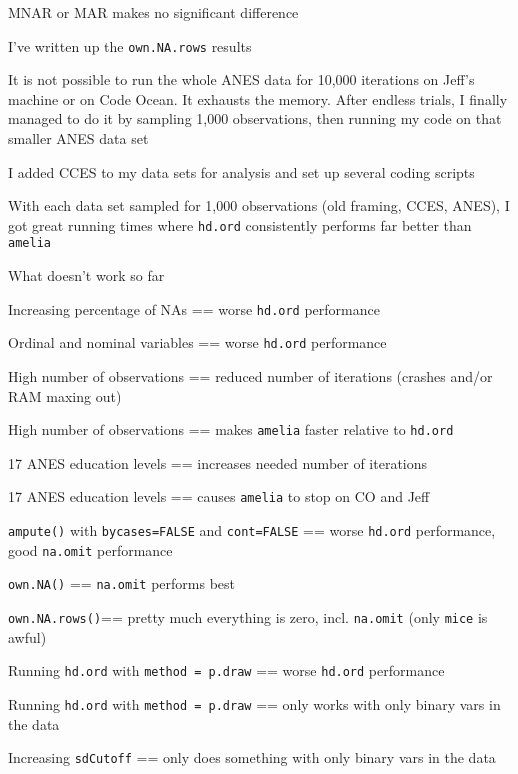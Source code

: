 \documentclass[12pt]{article}
\begin{document}
\begin{coi}
\begin{coi}
				\item MNAR or MAR makes no significant difference
			\end{coi}
		\item I've written up the \texttt{own.NA.rows} results
		\item It is not possible to run the whole ANES data for 10,000 iterations on Jeff's machine or on Code Ocean. It exhausts the memory. After endless trials, I finally managed to do it by sampling 1,000 observations, then running my code on that smaller ANES data set
		\item I added CCES to my data sets for analysis and set up several coding scripts
		\item With each data set sampled for 1,000 observations (old framing, CCES, ANES), I got great running times where \texttt{hd.ord} consistently performs far better than \texttt{amelia}
		\item What doesn't work so far
			\begin{coi}
				\item Increasing percentage of NAs == worse \texttt{hd.ord} performance
				\item Ordinal and nominal variables == worse \texttt{hd.ord} performance
				\item High number of observations == reduced number of iterations (crashes and/or RAM maxing out)
				\item High number of observations == makes \texttt{amelia} faster relative to \texttt{hd.ord}
				\item 17 ANES education levels == increases needed number of iterations
				\item 17 ANES education levels == causes \texttt{amelia} to stop on CO and Jeff
				\item \texttt{ampute()} with \texttt{bycases=FALSE} and \texttt{cont=FALSE} == worse \texttt{hd.ord} performance, good \texttt{na.omit} performance
				\item \texttt{own.NA()} == \texttt{na.omit} performs best
				\item \texttt{own.NA.rows()}== pretty much everything is zero, incl. \texttt{na.omit} (only \texttt{mice} is awful)
				\item Running \texttt{hd.ord} with \texttt{method = p.draw} == worse \texttt{hd.ord} performance
				\item Running \texttt{hd.ord} with \texttt{method = p.draw} == only works with only binary vars in the data
				\item Increasing \texttt{sdCutoff} == only does something with only binary vars in the data

\end{coi}
\end{coi}
\end{document}
